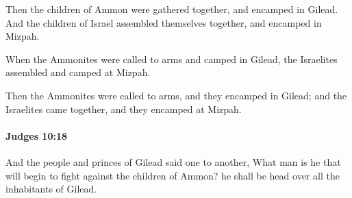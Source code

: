 			\begin{versebox}
					\item[BHS] 
					\item[ASV] Then the children of Ammon were gathered together, and encamped in Gilead. And the children of Israel assembled themselves together, and encamped in Mizpah.
					\item[NIV] When the Ammonites were called to arms and camped in Gilead, the Israelites assembled and camped at Mizpah.
					\item[NRSV] Then the Ammonites were called to arms, and they encamped in Gilead; and the Israelites came together, and they encamped at Mizpah.
			\end{versebox}

		\paragraph{Judges 10:18} %
			\label{JUDGES-10-18}

			And the people and princes of Gilead said one to another, What man is he that will begin to fight against the children of Ammon? he shall be head over all the inhabitants of Gilead.

